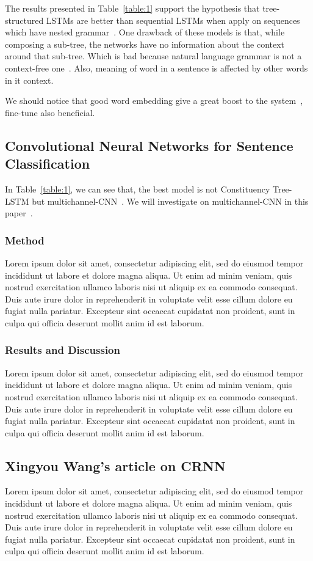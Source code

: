 The results presented in Table~\ref{table:1} support the hypothesis that tree-structured LSTMs are better than sequential LSTMs when apply on sequences which have nested grammar~\cite{treeVSseq}. 
One drawback of these models is that, while composing a sub-tree, the networks have no information about the context around that sub-tree.
Which is bad because natural language grammar is not a context-free one~\cite{noContextFree}.
Also, meaning of word in a sentence is affected by other words in it context.

We should notice that good word embedding give a great boost to the system~\cite{Luong_betterword}, fine-tune also beneficial.

\subsection{Convolutional Neural Networks for Sentence Classification}
In Table~\ref{table:1}, we can see that, the best model is not Constituency Tree-LSTM but multichannel-CNN~\cite{KimCNN}. 
We will investigate on multichannel-CNN in this paper~\cite{KimCNN}.

\subsubsection{Method}
Lorem ipsum dolor sit amet, consectetur adipiscing elit, sed do eiusmod tempor incididunt ut labore et dolore magna aliqua. Ut enim ad minim veniam, quis nostrud exercitation ullamco laboris nisi ut aliquip ex ea commodo consequat. Duis aute irure dolor in reprehenderit in voluptate velit esse cillum dolore eu fugiat nulla pariatur. Excepteur sint occaecat cupidatat non proident, sunt in culpa qui officia deserunt mollit anim id est laborum.
\subsubsection{Results and Discussion}
Lorem ipsum dolor sit amet, consectetur adipiscing elit, sed do eiusmod tempor incididunt ut labore et dolore magna aliqua. Ut enim ad minim veniam, quis nostrud exercitation ullamco laboris nisi ut aliquip ex ea commodo consequat. Duis aute irure dolor in reprehenderit in voluptate velit esse cillum dolore eu fugiat nulla pariatur. Excepteur sint occaecat cupidatat non proident, sunt in culpa qui officia deserunt mollit anim id est laborum.

\subsection{Xingyou Wang's article on CRNN}
Lorem ipsum dolor sit amet, consectetur adipiscing elit, sed do eiusmod tempor incididunt ut labore et dolore magna aliqua. Ut enim ad minim veniam, quis nostrud exercitation ullamco laboris nisi ut aliquip ex ea commodo consequat. Duis aute irure dolor in reprehenderit in voluptate velit esse cillum dolore eu fugiat nulla pariatur. Excepteur sint occaecat cupidatat non proident, sunt in culpa qui officia deserunt mollit anim id est laborum.
